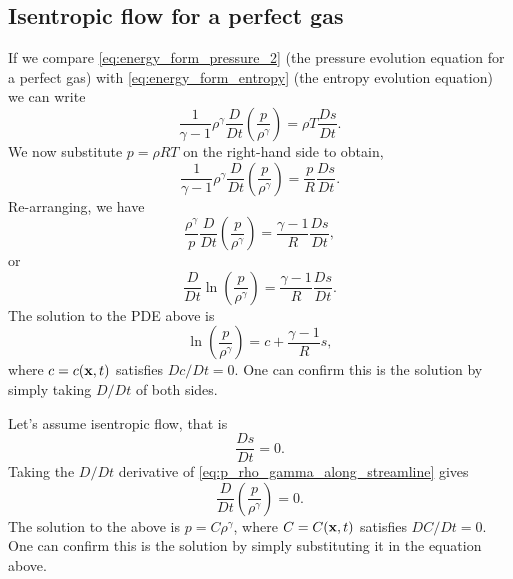 \documentclass[oneside,a4paper,11pt]{report}
\begin{document}
\subsection{Isentropic flow for a perfect gas}
If we compare \cref{eq:energy_form_pressure_2} (the pressure evolution equation for a perfect gas) with \cref{eq:energy_form_entropy} (the entropy evolution equation) we can write
\begin{equation*}
        \frac{1}{\gamma - 1} \rho^\gamma \frac{D}{D t} \left ( \frac{p}{\rho^\gamma} \right ) = \rho T \frac{Ds}{Dt}.
\end{equation*}
We now substitute $p = \rho R T$ on the right-hand side to obtain,
\begin{equation*}
    \frac{1}{\gamma - 1} \rho^\gamma \frac{D}{D t} \left ( \frac{p}{\rho^\gamma} \right ) = \frac{p}{R} \frac{Ds}{Dt}.
\end{equation*}
Re-arranging, we have 
\begin{equation*}
    \frac{\rho^\gamma}{p} \frac{D}{D t} \left ( \frac{p}{\rho^\gamma} \right ) = \frac{\gamma - 1}{R} \frac{Ds}{Dt},
\end{equation*}
or 
\begin{equation*}
    \frac{D}{D t} \ln \left ( \frac{p}{\rho^\gamma} \right ) = \frac{\gamma - 1}{R} \frac{Ds}{Dt}.
\end{equation*}
The solution to the PDE above is
\begin{equation}
    \label{eq:p_rho_gamma_along_streamline}
    \ln \left ( \frac{p}{\rho^\gamma} \right ) = c + \frac{\gamma -1}{R} s,
\end{equation}
where $c=c(\mathbf{x},t)$ satisfies $Dc/Dt = 0$. One can confirm this is the solution by simply taking $D/Dt$ of both sides. 

Let's assume isentropic flow, that is 
\begin{equation*}
\frac{Ds}{Dt} = 0. 
\end{equation*}
Taking the $D/Dt$ derivative of \cref{eq:p_rho_gamma_along_streamline} gives
\begin{equation}
    \label{eq:p_rho_gamma_isentropic}
    \frac{D}{Dt} \left ( \frac{p}{\rho^\gamma} \right ) = 0.
\end{equation}
The solution to the above is $p = C \rho^\gamma$, where $C = C(\mathbf{x},t)$ satisfies $DC/Dt = 0$. One can confirm this is the solution by simply substituting it in the equation above.
\end{document}
